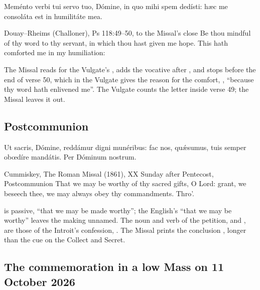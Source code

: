 
\begin{latinproper}
Meménto verbi tui servo tuo, Dómine, in quo mihi spem dedísti: hæc me
consoláta est in humilitáte mea.
\end{latinproper}

\begin{englishwitness}{Douay--Rheims (Challoner), Ps 118:49--50, to the Missal's close}
Be thou mindful of thy word to thy servant, in which thou hast given me hope.
This hath comforted me in my humiliation:
\end{englishwitness}

\noindent The Missal reads  for the Vulgate's ,
adds the vocative  after , and stops before the
end of verse 50, which in the Vulgate gives the reason for the comfort,
, ``because thy word hath enlivened
me''. The Vulgate counts the letter  inside verse 49; the Missal
leaves it out.

\subsection{Postcommunion}
\label{proper-postcommunion}


\begin{latinproper}
Ut sacris, Dómine, reddámur digni munéribus: fac nos, quǽsumus, tuis semper
obœdíre mandátis. Per Dóminum nostrum.
\end{latinproper}

\begin{englishwitness}{Cummiskey, The Roman Missal (1861), XX Sunday after Pentecost, Postcommunion}
That we may be worthy of thy sacred gifts, O Lord: grant, we beseech thee, we
may always obey thy commandments. Thro'.
\end{englishwitness}

\noindent {} is passive, ``that we may be made worthy''; the
English's ``that we may be worthy'' leaves the making unnamed. The noun and verb
of the petition,  and , are those of the
Introit's confession, . The Missal prints
the conclusion , longer than the cue on the Collect
and Secret.

\subsection{The commemoration in a low Mass on 11 October 2026}

